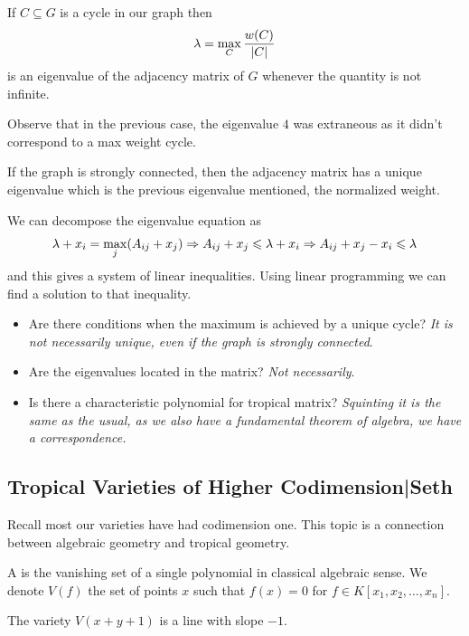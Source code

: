 \documentclass[12pt]{memoir}
\begin{document}
\begin{Lem}
    If $C\subseteq G$ is a cycle in our graph then 
    $$\lambda=\max_{C}\frac{w(C)}{|C|}$$
    is an eigenvalue of the adjacency matrix of $G$ whenever the quantity is not infinite.
\end{Lem}

Observe that in the previous case, the eigenvalue $4$ was extraneous as it didn't correspond to a max weight cycle.

\begin{Th}
If the graph is strongly connected, then the adjacency matrix has a unique eigenvalue which is the previous eigenvalue mentioned, the normalized weight.
\end{Th}

We can decompose the eigenvalue equation as 
$$\lambda+x_i=\max_j(A_{ij}+x_j)\Rightarrow A_{ij}+x_j\leqslant\lambda+x_i\Rightarrow A_{ij}+x_j-x_i\leqslant\lambda$$
and this gives a system of linear inequalities. Using linear programming we can find a solution to that inequality.
\begin{itemize}
    \item Are there conditions when the maximum is achieved by a unique cycle? \emph{It is not necessarily unique, even if the graph is strongly connected}.
    \item Are the eigenvalues located in the matrix? \emph{Not necessarily}.
    \item Is there a characteristic polynomial for tropical matrix? \emph{Squinting it is the same as the usual, as we also have a fundamental theorem of algebra, we have a correspondence.}
\end{itemize}

\subsection{Tropical Varieties of Higher Codimension|Seth}

Recall most our varieties have had codimension one. This topic is a connection between algebraic geometry and tropical geometry.

\begin{Def}
    A  is the vanishing set of a single polynomial in classical algebraic sense. We denote $V(f)$ the set of points $x$ such that $f(x)=0$ for $f\in K[x_1,x_2,\dots,x_n]$.
\end{Def}

\begin{Ex}
    The variety $V(x+y+1)$ is a line with slope $-1$. 
\end{Ex}
\end{document}
